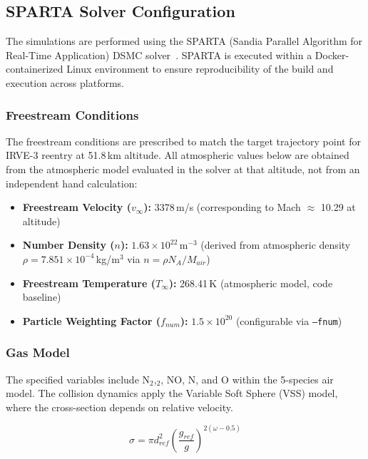 \subsection{SPARTA Solver Configuration}
The simulations are performed using the SPARTA (Sandia Parallel Algorithm for Real-Time Application) DSMC solver~\cite{plimpton2014sparta}. SPARTA is executed within a Docker-containerized Linux environment to ensure reproducibility of the build and execution across platforms.

\subsubsection*{Freestream Conditions}
The freestream conditions are prescribed to match the target trajectory point for IRVE-3 reentry at 51.8\,km altitude. All atmospheric values below are obtained from the atmospheric model evaluated in the solver at that altitude, not from an independent hand calculation:

\begin{itemize}
    \item \textbf{Freestream Velocity ($v_{\infty}$):} 3378\,m/s (corresponding to Mach $\approx$ 10.29 at altitude)

    \item \textbf{Number Density ($n$):} $1.63 \times 10^{22}$\,m$^{-3}$ (derived from atmospheric density $\rho = 7.851 \times 10^{-4}$\,kg/m$^3$ via $n = \rho N_A / M_{air}$)

    \item \textbf{Freestream Temperature ($T_{\infty}$):} 268.41\,K (atmospheric model, code baseline)

    \item \textbf{Particle Weighting Factor ($f_{num}$):} $1.5 \times 10^{20}$ (configurable via \texttt{--fnum})
\end{itemize}

\subsubsection*{Gas Model}
The specified variables include N$_2$,$_2$, NO, N, and O within the 5-species air model. The collision dynamics apply the Variable Soft Sphere (VSS) model, where the cross-section depends on relative velocity.

\begin{equation}
    \sigma = \pi d_{ref}^2 \left( \frac{g_{ref}}{g} \right)^{2(\omega - 0.5)}
\end{equation}


